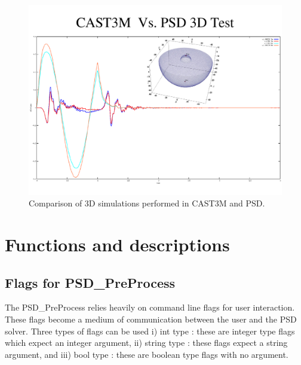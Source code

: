 \documentclass{report}
\begin{document}
\begin{figure}
	\centering
	\includegraphics[width=.85\textwidth]{./Images/Cast3MPSD.pdf}
	\caption{Comparison of 3D simulations performed  in CAST3M and PSD.   }\label{fig:CastemPSD3D}
\end{figure}




\chapter{Functions and descriptions}
\section{Flags for PSD\_PreProcess}

The {\ttfamily PSD\_PreProcess}  relies heavily on command line flags for user interaction. These flags become a medium of communication between the user and the PSD solver. Three types of flags can be used i)  {\ttfamily int} type : these are integer type flags which expect an integer argument, ii) {\ttfamily string} type : these flags expect a string argument, and iii) {\ttfamily bool} type : these are boolean type flags with no argument. 
\end{document}
